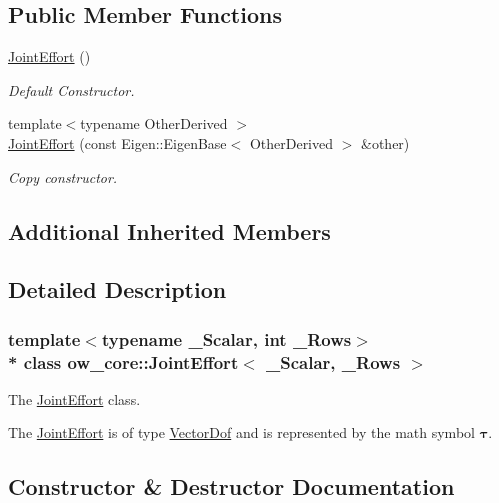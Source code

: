 \subsection*{Public Member Functions}
\begin{DoxyCompactItemize}
\item 
\hyperlink{classow__core_1_1JointEffort_a7a6eb1b97b2b8b3bac294a1c2115b277}{Joint\+Effort} ()\hypertarget{classow__core_1_1JointEffort_a7a6eb1b97b2b8b3bac294a1c2115b277}{}\label{classow__core_1_1JointEffort_a7a6eb1b97b2b8b3bac294a1c2115b277}

\begin{DoxyCompactList}\small\item\em Default Constructor. \end{DoxyCompactList}\item 
{\footnotesize template$<$typename Other\+Derived $>$ }\\\hyperlink{classow__core_1_1JointEffort_ab554628edbca575f0134f5604bedbdec}{Joint\+Effort} (const Eigen\+::\+Eigen\+Base$<$ Other\+Derived $>$ \&other)
\begin{DoxyCompactList}\small\item\em Copy constructor. \end{DoxyCompactList}\end{DoxyCompactItemize}
\subsection*{Additional Inherited Members}


\subsection{Detailed Description}
\subsubsection*{template$<$typename \+\_\+\+Scalar, int \+\_\+\+Rows$>$\\*
class ow\+\_\+core\+::\+Joint\+Effort$<$ \+\_\+\+Scalar, \+\_\+\+Rows $>$}

The \hyperlink{classow__core_1_1JointEffort}{Joint\+Effort} class. 

The \hyperlink{classow__core_1_1JointEffort}{Joint\+Effort} is of type \hyperlink{classow__core_1_1VectorDof}{Vector\+Dof} and is represented by the math symbol $\mathbf{\tau}$. 

\subsection{Constructor \& Destructor Documentation}
